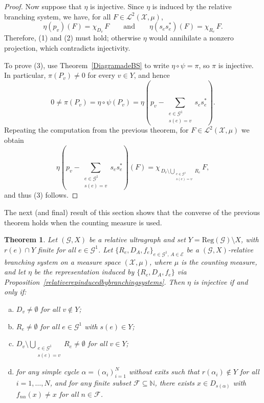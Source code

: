 \documentclass[12pt, reqno]{amsart}
\newtheorem{theorem}{Theorem}[section]
\theoremstyle{definition}
\theoremstyle{remark}
\numberwithin{equation}{section}
\begin{document}
\begin{proof}
Now suppose that $\eta$ is injective. Since $\eta$ is induced by the relative branching system, we
have, for all $F \in \mathcal{L}^2(\mathcal{X},\mu)$,
\[
\eta(p_v)(F) = \chi_{D_v}\,F
\qquad\text{and}\qquad
\eta(s_e s_e^*)(F) = \chi_{R_e}\,F .
\]
Therefore, (1) and (2) must hold; otherwise $\eta$ would annihilate a nonzero projection, which
contradicts injectivity.

To prove (3), use Theorem~\ref{DiagramadeBS} to write $\eta \circ \psi = \pi$, so $\pi$ is
injective. In particular, $\pi(P_v) \neq 0$ for every $v \in Y$, and hence
\[
0 \neq \pi(P_v) = \eta \circ \psi(P_v)
= \eta\!\left( p_v - \sum_{\substack{e \in \mathcal{G}^1\\ s(e)=v}} s_e s_e^* \right).
\]
Repeating the computation from the previous theorem, for $F \in \mathcal{L}^2(\mathcal{X},\mu)$ we obtain
\[
\eta\!\left( p_v - \sum_{\substack{e \in \mathcal{G}^1\\ s(e)=v}} s_e s_e^* \right)(F)
= \chi_{\,D_v \setminus \displaystyle\bigcup_{\substack{e \in \mathcal{G}^1\\ s(e)=v}} R_e}\,F,
\]
and thus (3) follows.

\end{proof}




The next (and final) result of this section shows that the converse of the previous theorem holds
when the counting measure is used.

\begin{theorem}\label{injectivitybscountingmeasure}
Let $(\mathcal{G}, X)$ be a relative ultragraph and set $Y=\mathrm{Reg}(\mathcal{G})\setminus X$,
with $r(e)\cap Y$ finite for all $e \in \mathcal{G}^1$. Let
$\{R_e,D_A,f_e\}_{e\in \mathcal{G}^1,\, A\in \mathcal{E}}$ be a $(\mathcal{G}, X)$-relative
branching system on a measure space $(\mathcal{X},\mu)$, where $\mu$ is the counting measure, and
let $\eta$ be the representation induced by $\{R_e,D_A,f_e\}$ via
Proposition~\ref{relativerepinducedbybranchingsystems}. Then $\eta$ is injective if and only if:
\begin{enumerate}[a)]
    \item $D_v \neq \emptyset$ for all $v \notin Y$;
    \item $R_e \neq \emptyset$ for all $e \in \mathcal{G}^1$ with $s(e) \in Y$;
    \item $D_v \setminus \displaystyle\bigcup_{\substack{e \in \mathcal{G}^1\\ s(e)=v}} R_e \neq \emptyset$
          for all $v \in Y$;
    \item for any simple cycle $\alpha=(\alpha_i)_{i=1}^N$ without exits such that
          $r(\alpha_i)\notin Y$ for all $i=1,\ldots,N$, and for any finite subset
          $\mathcal{F}\subseteq\mathbb{N}$, there exists $x \in D_{s(\alpha)}$ with
          $f_{n\alpha}(x) \neq x$ for all $n \in \mathcal{F}$.
\end{enumerate}
\end{theorem}
\end{document}
